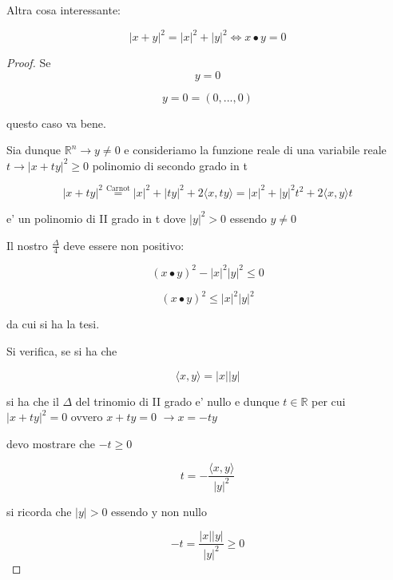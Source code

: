 \documentclass[11pt]{article}
\begin{document}
Altra cosa interessante:

 \[
    |x+y|^{2}= |x|^{2} + |y|^{2} \Leftrightarrow x\bullet y  =0
 \]




 \begin{proof}
     Se
     \[
        y=0
     \]

     \[
         y=0=(0,...,0) 
     \]
     
     questo caso va bene.

     Sia dunque $\mathbb{R}^{n} \rightarrow y \neq 0$ e consideriamo la funzione reale di una variabile reale $t \rightarrow |x+ty|^{2}\ge 0$ polinomio di secondo grado in t

     \[
         |x + ty| ^{2} \overset{\text{Carnot}}{=} |x|^{2} + |ty|^{2} + 2\langle x,ty \rangle  = |x|^{2} + |y|^{2}t^{2} + 2 \langle x,y \rangle t
     \]

     e' un polinomio di II grado in t dove $|y|^{2}> 0 $ essendo $y \neq 0$

     Il nostro $\frac{\Delta}{4}$ deve essere non positivo:

     \[
         (x\bullet y ) ^{2} - |x| ^{2}|y|^{2} \le 0
     \]

     \[
         (x\bullet y ) ^{2}\le  |x| ^{2}|y|^{2} 
     \]

     da cui si ha la tesi.

     Si verifica, se si ha che

     \[
         \langle x,y \rangle = |x| |y|
     \]

     si ha che il $\Delta$ del trinomio di II grado e' nullo e dunque $t \in \mathbb{R}$ per cui $|x+ty|^{2}=0$ ovvero $x +ty=0$ $\rightarrow x=-ty$

     devo mostrare che $-t \ge 0$


     \[
         t = - \frac{\langle x,y \rangle}{|y|^{2}}
     \]

     si ricorda che $|y|>0$ essendo y non nullo

     \[
         -t = \frac{|x| |y|}{|y|^{2}}\ge 0
     \]

 \end{proof}
\end{document}
